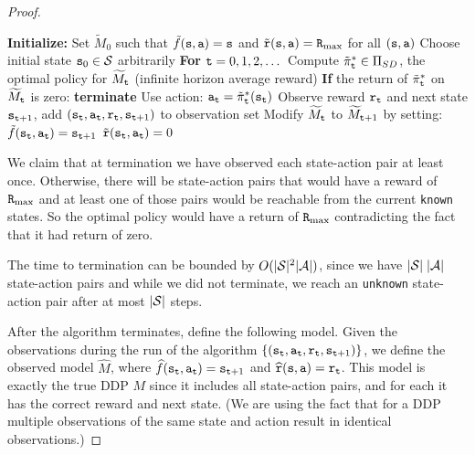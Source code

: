 \begin{proof}
\begin{algorithm}[H]
\begin{algorithmic}[1]
\State \textbf{Initialize:}
\State Set $\widetilde{M}_0$ such that $\tilde{f}({\tt s}, {\tt a}) = {\tt s}$ and $\tilde{{\tt r}}({\tt s}, {\tt a}) = {\tt R}_{\max }$ for all $({\tt s}, {\tt a})$
\State Choose initial state ${\tt s}_0 \in \mathcal{S}$ arbitrarily
\State \textbf{For} ${\tt t} = 0,1,2,\dots$
\State \quad Compute $\tilde{\pi}^*_{\tt t} \in \Pi_{SD}$, the optimal policy for $\widetilde{M}_{\tt t}$ (infinite horizon average reward)
\State \quad \textbf{If} the return of $\tilde{\pi}^*_{\tt t}$ on $\widetilde{M}_{\tt t}$ is zero: \textbf{terminate}
\State \quad Use action: ${\tt a}_{\tt t} = \tilde{\pi}^*_{\tt t}({\tt s}_{\tt t})$
\State \quad Observe reward ${\tt r}_{\tt t}$ and next state ${\tt s}_{{\tt t}+1}$, add $({\tt s}_{\tt t}, {\tt a}_{\tt t}, {\tt r}_{\tt t}, {\tt s}_{{\tt t}+1})$ to observation set
\State \quad Modify $\widetilde{M}_{\tt t}$ to $\widetilde{M}_{{\tt t}+1}$ by setting:
\State \quad \quad $\tilde{f}({\tt s}_{\tt t}, {\tt a}_{\tt t}) = {\tt s}_{{\tt t}+1}$
\State \quad \quad $\tilde{{\tt r}}({\tt s}_{\tt t}, {\tt a}_{\tt t}) = 0$
\end{algorithmic}
\end{algorithm}

We claim that at termination we have observed each state-action pair
at least once. Otherwise, there will be state-action pairs that
would have a reward of ${\tt R}_{\max }$ and at least one of those pairs would
be reachable from the current \texttt{known} states. So the optimal policy
would have a return of ${\tt R}_{\max }$ contradicting the fact that it had
return of zero.

The time to termination can be bounded by  $O(|\mathcal{S}|^2 |\mathcal{A}|)$, since we have  $|\mathcal{S}|\; |\mathcal{A}|$ state-action pairs and while we did not terminate, we reach an \texttt{unknown} state-action pair after at most  $|\mathcal{S}|$ steps.

After the algorithm terminates, define the following model. Given
the observations during the run of the algorithm
$\{({\tt s}_{\tt t},{\tt a}_{\tt t} ,{\tt r}_{\tt t},
{\tt s}_{{\tt t}+1})\}$, we define the observed model $\widehat{M}$,
where $\widehat{f}({\tt s}_{\tt t},{\tt a}_{\tt t})={\tt s}_{{\tt t}+1}$
and $\widehat{{\tt r}}({\tt s},{\tt a})={\tt r}_{\tt t}$. This model
is exactly the true DDP $M$ since it includes all state-action
pairs, and for each it has the correct reward and next state. (We
are using the fact that for a DDP multiple observations of the same
state and action result in identical observations.)
\end{proof}

